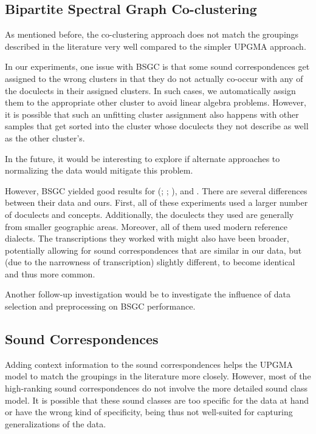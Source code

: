 \documentclass[a4paper]{article}
\begin{document}
\subsection{Bipartite Spectral Graph Co-clustering}

As mentioned before, the co-clustering approach
does not match the groupings described in the literature very well
compared to the simpler UPGMA approach.

In our experiments, one issue with BSGC is that some
sound correspondences get assigned to the wrong clusters
in that they do not actually co-occur with any of the
doculects in their assigned clusters.
In such cases, we automatically assign them to the appropriate
other cluster to avoid linear algebra problems.
However, it is possible that such an unfitting
cluster assignment also happens with other samples
that get sorted into the cluster whose
doculects they not describe as well as the other cluster's.

In the future, it would be interesting to
explore if alternate approaches to normalizing the data
would mitigate this problem.

However, BSGC yielded good results for \citeauthor{wieling2011bipartite}
(\citeyear{wieling2009bipartite}; \citeyear{wieling2010hierarchical}; \citeyear{wieling2011bipartite}),
\citet{wieling2013analyzing} and \citet{montemagni2013synchronic}.
There are several differences between their data and ours.
First, all of these experiments used a larger number
of doculects and concepts.
Additionally, the doculects they used are
generally from smaller geographic areas.
Moreover, all of them used modern reference dialects.
The transcriptions they worked with might also have been broader,
potentially allowing for sound correspondences that are similar in our data,
but (due to the narrowness of transcription) slightly different,
to become identical and thus more common.

Another follow-up investigation would be to investigate the influence of
data selection and preprocessing on BSGC performance.

\subsection{Sound Correspondences}

Adding context information to the sound correspondences
helps the UPGMA model to match the groupings in the literature more closely.
However, most of the high-ranking sound correspondences
do not involve the more detailed sound class model.
It is possible that these sound classes are too specific
for the data at hand or have the wrong kind of specificity,
being thus not well-suited for capturing generalizations of the data.
\end{document}
